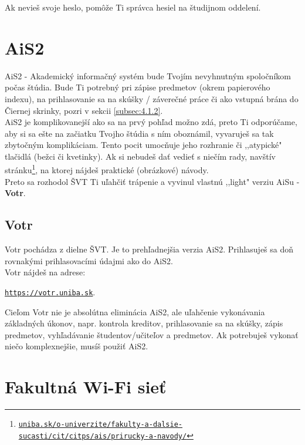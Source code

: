Ak nevieš svoje heslo, pomôže Ti správca hesiel na študijnom oddelení.

\section{AiS2} 

AiS2 - Akademický informačný systém bude Tvojím nevyhnutným spoločníkom počas štúdia. Bude Ti potrebný pri zápise predmetov (okrem papierového indexu), na prihlasovanie sa na skúšky / záverečné práce či ako vstupná brána do Čiernej skrinky, pozri v sekcii \ref{subsec:4.1.2}. \\

AiS2 je komplikovanejší ako sa na prvý pohľad možno zdá, preto Ti odporúčame, aby si sa ešte na začiatku Tvojho štúdia s ním oboznámil, vyvaruješ sa tak zbytočným komplikáciam. Tento pocit umocňuje jeho rozhranie či ,,atypické" tlačidlá (bežci či kvetinky). Ak si nebudeš dať vedieť s niečím rady, navštív stránku\footnote{\href{https://uniba.sk/o-univerzite/fakulty-a-dalsie-sucasti/cit/citps/ais/prirucky-a-navody/}{\texttt{uniba.sk/o-univerzite/fakulty-a-dalsie-sucasti/cit/citps/ais/prirucky-a-navody/}}}, na ktorej nájdeš praktické (obrázkové) návody. \\

Preto sa rozhodol ŠVT Ti uľahčiť trápenie a vyvinul vlastnú ,,light" verziu AiSu - \textbf{Votr}. 

\subsection{Votr}

Votr pochádza z dielne ŠVT. Je to prehľadnejšia verzia AiS2. Prihlasuješ sa doň rovnakými prihlasovacími údajmi ako do AiS2. \\

Votr nájdeš na adrese: 


\begin{center}
	\href{https://votr.uniba.sk}{\texttt{https://votr.uniba.sk}}.
\end{center}

Cieľom Votr nie je absolútna eliminácia AiS2, ale uľahčenie vykonávania základných úkonov, napr. kontrola kreditov, prihlasovanie sa na skúšky, zápis predmetov, vyhľadávanie študentov/učiteľov a predmetov. Ak potrebuješ vykonať niečo komplexnejšie, musíš použiť AiS2.  

\section{Fakultná Wi-Fi sieť}

